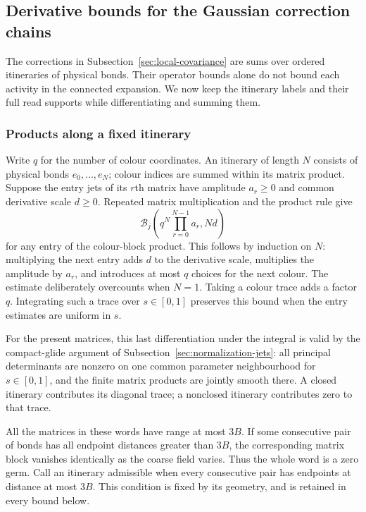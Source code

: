 \subsection{Derivative bounds for the Gaussian correction chains}
\label{sec:itinerary-prices}
The corrections in Subsection~\ref{sec:local-covariance} are sums
over ordered itineraries of physical bonds. Their operator bounds alone do not bound each
activity in the connected expansion. We now keep the itinerary
labels and their full read supports while differentiating and
summing them.

\subsubsection{Products along a fixed itinerary}
Write $q$ for the number of colour coordinates. An itinerary of
length $N$ consists of physical bonds $e_0,\ldots,e_N$; colour
indices are summed within its matrix product. Suppose the entry
jets of its $r$th matrix have amplitude $a_r\ge0$ and common
derivative scale $d\ge0$. Repeated matrix multiplication and the
product rule give
\begin{equation}\label{eq:itinerary-entry-price}
 \mathcal B_j\!\left(q^N\prod_{r=0}^{N-1}a_r,Nd\right)
\end{equation}
for any entry of the colour-block product. This follows by
induction on $N$: multiplying the next entry adds $d$ to the
derivative scale, multiplies the amplitude by $a_r$, and introduces
at most $q$ choices for the next colour. The estimate deliberately
overcounts when $N=1$. Taking a colour trace adds a factor $q$.
Integrating such a trace over $s\in[0,1]$ preserves this bound
when the entry estimates are uniform in $s$.

For the present matrices, this last differentiation under the
integral is valid by the compact-glide argument of
Subsection~\ref{sec:normalization-jets}: all principal determinants
are nonzero on one common parameter neighbourhood for $s\in[0,1]$,
and the finite matrix products are jointly smooth there. A closed
itinerary contributes its diagonal trace; a nonclosed itinerary
contributes zero to that trace.

All the matrices in these words have range at most $3B$. If some
consecutive pair of bonds has all endpoint distances greater than
$3B$, the corresponding matrix block vanishes identically as the
coarse field varies. Thus the whole word is a zero germ. Call an
itinerary admissible when every consecutive pair has endpoints
at distance at most $3B$. This condition is fixed by its geometry,
and is retained in every bound below.

